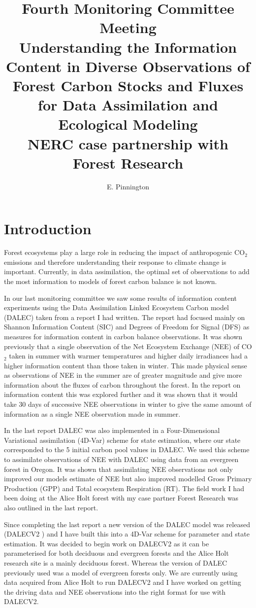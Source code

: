 \documentclass[11pt]{article}
\title{Fourth Monitoring Committee Meeting\\\vspace{4mm} \normalsize{Understanding the Information Content in Diverse Observations of Forest Carbon Stocks and Fluxes for Data Assimilation and Ecological Modeling\\ NERC case partnership with Forest Research}}
\author{\normalsize{E. Pinnington}}
\begin{document}
\maketitle

\section{Introduction}

Forest ecosystems play a large role in reducing the impact of anthropogenic CO$_2$ emissions and therefore understanding their response to climate change is important. Currently, in data assimilation, the optimal set of observations to add the most information to models of forest carbon balance is not known.  

In our last monitoring committee we saw some results of information content experiments using the Data Assimilation Linked Ecosystem Carbon model (DALEC) \citep{williams2005improved} taken from a report I had written. The report had focused mainly on Shannon Information Content (SIC) \citep{rodgers2000inverse} and Degrees of Freedom for Signal (DFS) \citep{fowler2011measures} as measures for information content in carbon balance observations. It was shown previously that a single observation of the Net Ecosystem Exchange (NEE) of CO$_2$ taken in summer with warmer temperatures and higher daily irradiances had a higher information content than those taken in winter. This made physical sense as observations of NEE in the summer are of greater magnitude and give more information about the fluxes of carbon throughout the forest. In the report on information content this was explored further and it was shown that it would take 30 days of successive NEE observations in winter to give the same amount of information as a single NEE observation made in summer.

In the last report DALEC was also implemented in a Four-Dimensional Variational assimilation (4D-Var) scheme for state estimation, where our state corresponded to the 5 initial carbon pool values in DALEC. We used this scheme to assimilate observations of NEE with DALEC using data from an evergreen forest in Oregon. It was shown that assimilating NEE observations not only improved our models estimate of NEE but also improved modelled Gross Primary Production (GPP) and Total ecosystem Respiration (RT). The field work I had been doing at the Alice Holt forest with my case partner Forest Research was also outlined in the last report.

Since completing the last report a new version of the DALEC model was released (DALECV2 \citep{Bloom2014}) and I have built this into a 4D-Var scheme for parameter and state estimation. It was decided to begin work on DALECV2 as it can be parameterised for both deciduous and evergreen forests and the Alice Holt research site is a mainly deciduous forest. Whereas the version of DALEC previously used was a model of  evergreen forests only. We are currently using data acquired from Alice Holt to run DALECV2 and I have worked on getting the driving data and NEE observations into the right format for use with DALECV2.
\end{document}
